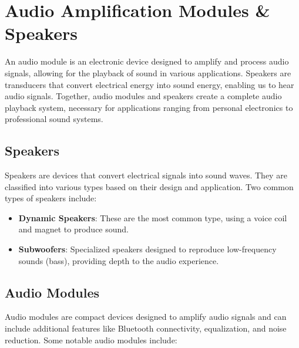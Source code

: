 \section{Audio Amplification Modules \& Speakers}

An audio module is an electronic device designed to amplify and process audio signals, allowing for the playback of sound in various applications. Speakers are transducers that convert electrical energy into sound energy, enabling us to hear audio signals. Together, audio modules and speakers create a complete audio playback system, necessary for applications ranging from personal electronics to professional sound systems.

\subsection{Speakers}

Speakers are devices that convert electrical signals into sound waves. They are classified into various types based on their design and application. Two common types of speakers include:

\begin{itemize}
	\item \textbf{Dynamic Speakers}: These are the most common type, using a voice coil and magnet to produce sound.
	\item \textbf{Subwoofers}: Specialized speakers designed to reproduce low-frequency sounds (bass), providing depth to the audio experience.
\end{itemize}

\subsection{Audio Modules}

Audio modules are compact devices designed to amplify audio signals and can include additional features like Bluetooth connectivity, equalization, and noise reduction. Some notable audio modules include:

